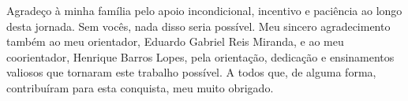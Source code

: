 \documentclass[
        oneside,      %
        english,			
        brazil			 
        ]{configcefetmglpd}
\begin{document}


\printacapa


\printacatalog  


\printafolhaaprov



 
\begin{agradecimentos}
Agradeço à minha família pelo apoio incondicional, incentivo e paciência ao longo desta jornada. Sem vocês, nada disso seria possível.
Meu sincero agradecimento também ao meu orientador, Eduardo Gabriel Reis Miranda, e ao meu coorientador, Henrique Barros Lopes, pela orientação, dedicação e ensinamentos valiosos que tornaram este trabalho possível.
A todos que, de alguma forma, contribuíram para esta conquista, meu muito obrigado.

\end{agradecimentos}


\end{document}
